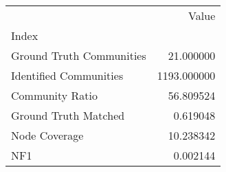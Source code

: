\begin{tabular}{lr}
\toprule
{} &        Value \\
Index                    &              \\
\midrule
Ground Truth Communities &    21.000000 \\
Identified Communities   &  1193.000000 \\
Community Ratio          &    56.809524 \\
Ground Truth Matched     &     0.619048 \\
Node Coverage            &    10.238342 \\
NF1                      &     0.002144 \\
\bottomrule
\end{tabular}
